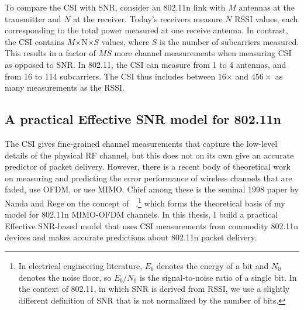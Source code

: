 To compare the CSI with SNR, consider an 802.11n link with $M$ antennas at the transmitter and $N$ at the receiver. Today's receivers measure $N$ RSSI values, each corresponding to the total power measured at one receive antenna. In contrast, the CSI contains $M$$\times$N$\times$$S$ values, where $S$ is the number of subcarriers measured. This results in a factor of $MS$ more channel measurements when measuring CSI as opposed to SNR\@. In 802.11, the CSI can measure from 1 to 4 antennas, and from 16 to 114 subcarriers. The CSI thus includes between 16$\times$ and $456\times$ as many measurements as the RSSI\@.


\subsection{A practical Effective SNR model for 802.11n}
The CSI gives fine-grained channel measurements that capture the low-level details of the physical RF channel, but this does not on its own give an accurate predictor of packet delivery. However, there is a recent body of theoretical work on measuring and predicting the error performance of wireless channels that are faded, use OFDM, or use MIMO\@. Chief among these is the seminal 1998 paper by Nanda and Rege on the concept of ~\cite{Nanda_effectiveSNR},\footnote{In electrical engineering literature, $E_b$ denotes the energy of a bit and $N_0$ denotes the noise floor, so $E_b/N_0$ is the signal-to-noise ratio of a single bit. In the context of 802.11, in which SNR is derived from RSSI, we use a slightly different definition of SNR that is not normalized by the number of bits.} which forms the theoretical basis of my model for 802.11n MIMO-OFDM channels. In this thesis, I build a practical Effective SNR-based model that uses CSI measurements from commodity 802.11n devices and makes accurate predictions about 802.11n packet delivery.

